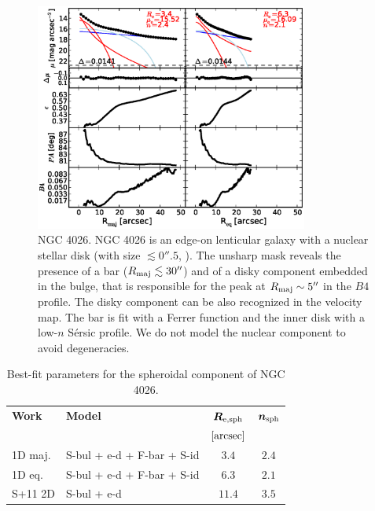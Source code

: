 \documentclass[preprint2]{emulateapj}
\newcommand{\fitfigurewidth}{0.8\textwidth}
\begin{document}
  \begin{figure}[h]
  \begin{center}
  \includegraphics[width=\fitfigurewidth]{images/n4026_1Dfit.eps}
  \caption{NGC 4026.
  NGC 4026 is an edge-on lenticular galaxy with a nuclear stellar disk (with size $\lesssim 0''.5$, \citealt{ledo2010}).
  The unsharp mask reveals the presence of a bar ($R_{\rm maj} \lesssim 30''$) and of a disky component 
  embedded in the bulge, that is responsible for the peak at $R_{\rm maj} \sim 5''$ in the $B4$ profile.
  The disky component can be also recognized in the velocity map.
  The bar is fit with a Ferrer function and the inner disk with a low-$n$ S\'ersic profile.
  We do not model the nuclear component to avoid degeneracies.
  }
  \end{center}
  \end{figure}

  \begin{table}[h]
  \small
  \caption{Best-fit parameters for the spheroidal component of NGC 4026.}
  \begin{center}
  \begin{tabular}{llcc}
  \hline
  {\bf Work} & {\bf Model}   & $\bm R_{\rm e,sph}$    & $\bm n_{\rm sph}$ \\
    &  &  $[\rm arcsec]$ & \\
  \hline
  1D maj. & S-bul + e-d + F-bar + S-id & $3.4$  &  $2.4$ \\
  1D eq.  & S-bul + e-d + F-bar + S-id & $6.3$  &  $2.1$ \\
  \hline
  S+11 2D         & S-bul + e-d & $11.4$  &  $3.5$ \\
  \hline
  \end{tabular}
  \end{center}
  \label{tab:n4026}
  \end{table}
\end{document}
